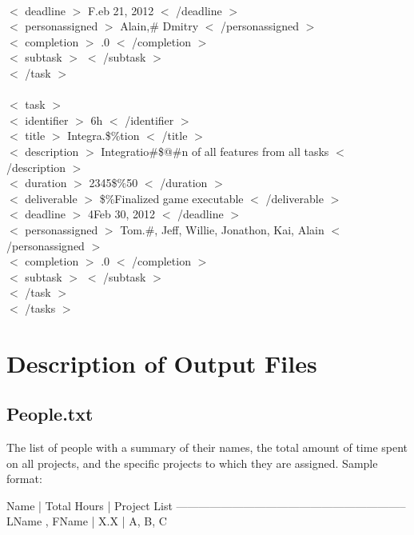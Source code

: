 \documentclass[12pt]{article}
\newcommand{\tab}{\hspace*{2em}}
\begin{document}
{\\ \tab    \tab $<$ deadline $>$ F.eb 21, 2012 $<$ /deadline $>$ 
\\ \tab    \tab $<$ personassigned $>$ Alain,\# Dmitry $<$ /personassigned $>$ 
\\ \tab    \tab $<$ completion $>$ .0 $<$ /completion $>$ 
\\ \tab    \tab $<$ subtask $>$  $<$ /subtask $>$ 
\\ \tab$<$ /task $>$ 
\\ 
\\ \tab$<$ task $>$ 
\\ \tab    \tab $<$ identifier $>$ 6h $<$ /identifier $>$ 
\\ \tab    \tab $<$ title $>$ Integra.\$\%tion $<$ /title $>$ 
\\ \tab    \tab $<$ description $>$ Integratio\#\$@\#n of all features from all tasks $<$ /description $>$ 
\\ \tab    \tab $<$ duration $>$ 2345\$\%50 $<$ /duration $>$ 
\\ \tab    \tab $<$ deliverable $>$ \$\%Finalized game executable $<$ /deliverable $>$ 
\\ \tab    \tab $<$ deadline $>$ 4Feb 30, 2012 $<$ /deadline $>$ 
\\ \tab    \tab $<$ personassigned $>$ Tom.\#, Jeff, Willie, Jonathon, Kai, Alain $<$ /personassigned $>$ 
\\ \tab    \tab $<$ completion $>$ .0 $<$ /completion $>$ 
\\ \tab    \tab $<$ subtask $>$  $<$ /subtask $>$ 
\\ \tab$<$ /task $>$ 
\\ $<$ /tasks $>$ 

}

\section{Description of Output Files}
\subsection{People.txt}

The list of people with a summary of their names, the total amount of time spent on all projects, and the specific projects to which they are assigned. Sample format:

Name                    | Total Hours | Project List
--------------------------------------------------------------
LName , FName           |         X.X | A, B, C
\end{document}

